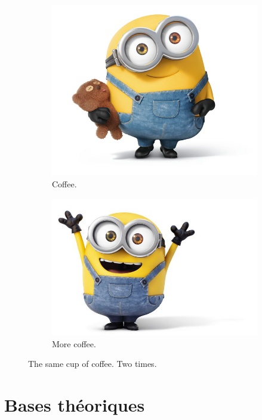 \documentclass[a4paper]{article}
\begin{document}
\begin{figure}[h!]
  \centering
  \begin{subfigure}[b]{0.4\linewidth}
    \includegraphics[width=\linewidth]{bob1.jpg}
    \caption{Coffee.}
  \end{subfigure}
  \begin{subfigure}[b]{0.4\linewidth}
    \includegraphics[width=\linewidth]{bob2.jpg}
    \caption{More coffee.}
  \end{subfigure}
  \caption{The same cup of coffee. Two times.}
  \label{fig:coffee}
\end{figure}

\part{Bases théoriques}
\end{document}
